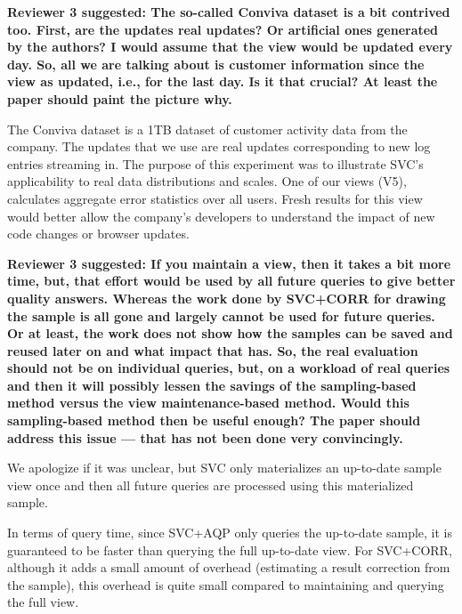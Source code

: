 \vspace{1.5em}

\textbf{Reviewer 3 suggested: The so-called Conviva dataset is a bit contrived too. First, are the updates real updates? Or artificial ones generated by the authors? I would assume that the view would be updated every day. So, all we are talking about is customer information since the view as updated, i.e., for the last day. Is it that crucial? At least the paper should paint the picture why.}

The Conviva dataset is a 1TB dataset of customer activity data from the company. The updates that we use are real updates corresponding to new log entries streaming in. %
The purpose of this experiment was to illustrate SVC's applicability to real data distributions and scales. One of our views (V5), calculates aggregate error statistics over all users.  Fresh results for this view would better allow the company's developers to understand the impact of new code changes or browser updates. 

\vspace{1.5em}

\textbf{Reviewer 3 suggested:  If you maintain a view, then it takes a bit more time, but, that effort would be used by all future queries to give better quality answers. Whereas the work done by SVC+CORR for drawing the sample is all gone and largely cannot be used for future queries. Or at least, the work does not show how the samples can be saved and reused later on and what impact that has. So, the real evaluation should not be on individual queries, but, on a workload of real queries and then it will possibly lessen the savings of the sampling-based method versus the view maintenance-based method. Would this sampling-based method then be useful enough? The paper should address this issue --- that has not been done very convincingly.}

We apologize if it was unclear, but SVC only materializes an up-to-date sample view once and then all future queries are processed using this materialized sample.

In terms of query time, since SVC+AQP only queries the up-to-date sample, it is guaranteed to be faster than querying the full up-to-date view. For SVC+CORR, although it adds a small amount of overhead (estimating a result correction from the sample), this overhead is quite small compared to maintaining and querying the full view. 

